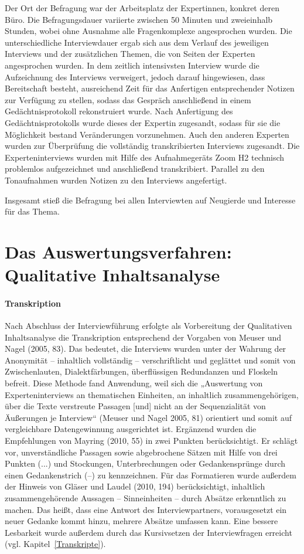 Der Ort der Befragung war der Arbeitsplatz der Expertinnen, konkret deren Büro. Die Befragungsdauer variierte zwischen 50 Minuten und zweieinhalb Stunden, wobei ohne Ausnahme alle Fragenkomplexe angesprochen wurden. Die unterschiedliche Interviewdauer ergab sich aus dem Verlauf des jeweiligen Interviews und der zusätzlichen Themen, die von Seiten der Experten angesprochen wurden. In dem zeitlich intensivsten Interview wurde die Aufzeichnung des Interviews verweigert, jedoch darauf hingewiesen, dass Bereitschaft besteht, ausreichend Zeit für das Anfertigen entsprechender Notizen zur Verfügung zu stellen, sodass das Gespräch anschließend in einem Gedächtnisprotokoll rekonstruiert wurde. Nach Anfertigung des Gedächtnisprotokolls wurde dieses der Expertin zugesandt, sodass für sie die Möglichkeit bestand Veränderungen vorzunehmen. Auch den anderen Experten wurden zur Überprüfung die vollständig transkribierten Interviews zugesandt. 
Die Experteninterviews wurden mit Hilfe des Aufnahmegeräts Zoom H2 technisch problemlos aufgezeichnet und anschließend transkribiert. Parallel zu den Tonaufnahmen wurden Notizen zu den Interviews angefertigt.  

Insgesamt stieß die Befragung bei allen Interviewten auf Neugierde und Interesse für das Thema.

\section{Das Auswertungsverfahren: Qualitative Inhaltsanalyse}

\paragraph{Transkription} Nach Abschluss der Interviewführung erfolgte als Vorbereitung der Qualitativen Inhaltsanalyse die Transkription entsprechend der Vorgaben von Meuser und Nagel (2005, 83). Das bedeutet, die Interviews wurden unter der Wahrung der Anonymität -- inhaltlich vollständig -- verschriftlicht und geglättet und somit von Zwischenlauten, Dialektfärbungen, überflüssigen Redundanzen und Floskeln befreit. Diese Methode fand Anwendung, weil sich die „Auswertung von Experteninterviews an thematischen Einheiten, an inhaltlich zusammengehörigen, über die Texte verstreute Passagen [und] nicht an der Sequenzialität von Äußerungen je Interview“ (Meuser und Nagel 2005, 81) orientiert und somit auf vergleichbare Datengewinnung ausgerichtet ist. 
Ergänzend wurden die Empfehlungen von Mayring (2010, 55) in zwei Punkten berücksichtigt. Er schlägt vor, unverständliche Passagen sowie abgebrochene Sätzen mit Hilfe von drei Punkten (...) und Stockungen, Unterbrechungen oder Gedankensprünge durch einen Gedankenstrich (--) zu kennzeichnen. 
Für das Formatieren wurde außerdem der Hinweis von Gläser und Laudel (2010, 194) berücksichtigt, inhaltlich zusammengehörende Aussagen -- Sinneinheiten -- durch Absätze erkenntlich zu machen. Das heißt, dass eine Antwort des Interviewpartners, vorausgesetzt ein neuer Gedanke kommt hinzu, mehrere Absätze umfassen kann. Eine bessere Lesbarkeit wurde außerdem durch das Kursivsetzen der Interviewfragen erreicht (vgl. Kapitel~\ref{Transkripte}). 

